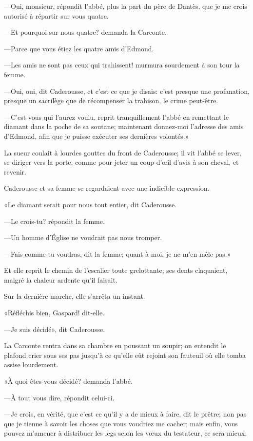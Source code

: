 —Oui, monsieur, répondit l'abbé, plus la part du père de Dantès, que je me crois autorisé à répartir sur vous quatre.

—Et pourquoi sur nous quatre? demanda la Carconte.

—Parce que vous étiez les quatre amis d'Edmond.

—Les amis ne sont pas ceux qui trahissent! murmura sourdement à son tour la femme.

—Oui, oui, dit Caderousse, et c'est ce que je disais: c'est presque une profanation, presque un sacrilège que de récompenser la trahison, le crime peut-être.

—C'est vous qui l'aurez voulu, reprit tranquillement l'abbé en remettant le diamant dans la poche de sa soutane; maintenant donnez-moi l'adresse des amis d'Edmond, afin que je puisse exécuter ses dernières volontés.»

La sueur coulait à lourdes gouttes du front de Caderousse; il vit l'abbé se lever, se diriger vers la porte, comme pour jeter un coup d'œil d'avis à son cheval, et revenir.

Caderousse et sa femme se regardaient avec une indicible expression.

«Le diamant serait pour nous tout entier, dit Caderousse.

—Le crois-tu? répondit la femme.

—Un homme d'Église ne voudrait pas nous tromper.

—Fais comme tu voudras, dit la femme; quant à moi, je ne m'en mêle pas.»

Et elle reprit le chemin de l'escalier toute grelottante; ses dents claquaient, malgré la chaleur ardente qu'il faisait.

Sur la dernière marche, elle s'arrêta un instant.

«Réfléchis bien, Gaspard! dit-elle.

—Je suis décidé», dit Caderousse.

La Carconte rentra dans sa chambre en poussant un soupir; on entendit le plafond crier sous ses pas jusqu'à ce qu'elle eût rejoint son fauteuil où elle tomba assise lourdement.

«À quoi êtes-vous décidé? demanda l'abbé.

—À tout vous dire, répondit celui-ci.

—Je crois, en vérité, que c'est ce qu'il y a de mieux à faire, dit le prêtre; non pas que je tienne à savoir les choses que vous voudriez me cacher; mais enfin, vous pouvez m'amener à distribuer les legs selon les vœux du testateur, ce sera mieux.

